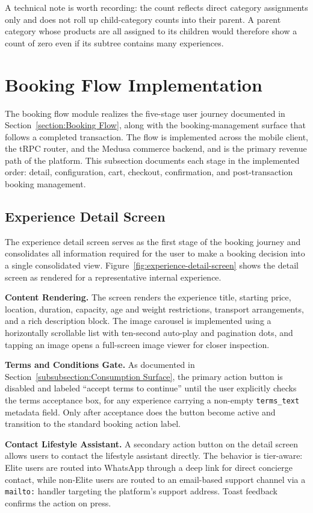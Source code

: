 A technical note is worth recording: the count reflects direct category assignments only and does not roll up child-category counts into their parent. A parent category whose products are all assigned to its children would therefore show a count of zero even if its subtree contains many experiences.

\section{Booking Flow Implementation}
The booking flow module realizes the five-stage user journey documented in Section~\ref{section:Booking Flow}, along with the booking-management surface that follows a completed transaction. The flow is implemented across the mobile client, the tRPC router, and the Medusa commerce backend, and is the primary revenue path of the platform. This subsection documents each stage in the implemented order: detail, configuration, cart, checkout, confirmation, and post-transaction booking management.

\subsection{Experience Detail Screen}
The experience detail screen serves as the first stage of the booking journey and consolidates all information required for the user to make a booking decision into a single consolidated view. Figure~\ref{fig:experience-detail-screen} shows the detail screen as rendered for a representative internal experience.

\noindent\textbf{Content Rendering.} The screen renders the experience title, starting price, location, duration, capacity, age and weight restrictions, transport arrangements, and a rich description block. The image carousel is implemented using a horizontally scrollable list with ten-second auto-play and pagination dots, and tapping an image opens a full-screen image viewer for closer inspection.

\textbf{Terms and Conditions Gate.} As documented in Section~\ref{subsubsection:Consumption Surface}, the primary action button is disabled and labeled ``accept terms to continue'' until the user explicitly checks the terms acceptance box, for any experience carrying a non-empty \texttt{terms\_text} metadata field. Only after acceptance does the button become active and transition to the standard booking action label.

\textbf{Contact Lifestyle Assistant.} A secondary action button on the detail screen allows users to contact the lifestyle assistant directly. The behavior is tier-aware: Elite users are routed into WhatsApp through a deep link for direct concierge contact, while non-Elite users are routed to an email-based support channel via a \texttt{mailto:} handler targeting the platform's support address. Toast feedback confirms the action on press.

